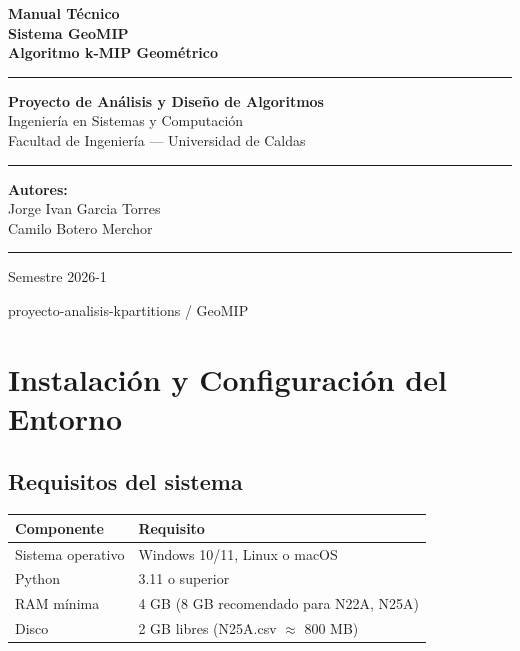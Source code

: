 \documentclass[12pt,a4paper]{article}
\begin{document}
\begin{titlepage}
    \centering
    \vspace*{1cm}
    {\Huge\bfseries\color{primary} Manual Técnico\\[0.5em]
    \Large Sistema GeoMIP\\[0.3em]
    \large Algoritmo k-MIP Geométrico}
    \vspace{1.5cm}

    \rule{\linewidth}{2pt}
    \vspace{0.5cm}

    {\large\textbf{Proyecto de Análisis y Diseño de Algoritmos}}\\[0.3em]
    {\large Ingeniería en Sistemas y Computación}\\[0.3em]
    {\large Facultad de Ingeniería — Universidad de Caldas}
    \vspace{1cm}

    \rule{\linewidth}{0.5pt}
    \vspace{0.8cm}

    {\large\textbf{Autores:}}\\[0.5em]
    {\large Jorge Ivan Garcia Torres}\\[0.3em]
    {\large Camilo Botero Merchor}
    \vspace{1cm}

    \rule{\linewidth}{0.5pt}
    \vspace{0.5cm}
    {\large Semestre 2026-1}

    \vfill
    {\small\color{gray} proyecto-analisis-kpartitions / GeoMIP}
\end{titlepage}

\tableofcontents
\newpage

\section{Instalación y Configuración del Entorno}

\subsection{Requisitos del sistema}
\begin{longtable}{ll}
    \toprule
    Componente & Requisito \\
    \midrule
    \endhead
    Sistema operativo & Windows 10/11, Linux o macOS \\
    Python & 3.11 o superior \\
    RAM mínima & 4 GB (8 GB recomendado para N22A, N25A) \\
    Disco & 2 GB libres (N25A.csv $\approx$ 800 MB) \\
    \bottomrule
\end{longtable}
\end{document}
